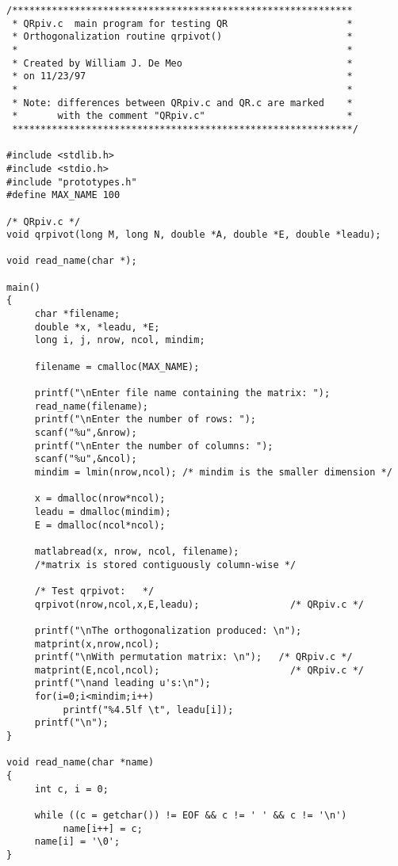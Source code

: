 \documentclass{article}
\begin{document}
\begin{verbatim}
/************************************************************
 * QRpiv.c  main program for testing QR                     *
 * Orthogonalization routine qrpivot()                      *
 *                                                          *
 * Created by William J. De Meo                             *
 * on 11/23/97                                              *
 *                                                          *
 * Note: differences between QRpiv.c and QR.c are marked    *
 *       with the comment "QRpiv.c"                         *
 ************************************************************/

#include <stdlib.h>
#include <stdio.h>
#include "prototypes.h"
#define MAX_NAME 100

/* QRpiv.c */
void qrpivot(long M, long N, double *A, double *E, double *leadu); 

void read_name(char *);

main()
{
     char *filename;
     double *x, *leadu, *E;
     long i, j, nrow, ncol, mindim;
  
     filename = cmalloc(MAX_NAME);

     printf("\nEnter file name containing the matrix: ");
     read_name(filename);
     printf("\nEnter the number of rows: ");
     scanf("%u",&nrow);
     printf("\nEnter the number of columns: ");
     scanf("%u",&ncol);
     mindim = lmin(nrow,ncol); /* mindim is the smaller dimension */

     x = dmalloc(nrow*ncol);
     leadu = dmalloc(mindim);
     E = dmalloc(ncol*ncol);
  
     matlabread(x, nrow, ncol, filename); 
     /*matrix is stored contiguously column-wise */

     /* Test qrpivot:   */
     qrpivot(nrow,ncol,x,E,leadu);                /* QRpiv.c */

     printf("\nThe orthogonalization produced: \n");
     matprint(x,nrow,ncol);
     printf("\nWith permutation matrix: \n");   /* QRpiv.c */
     matprint(E,ncol,ncol);                       /* QRpiv.c */
     printf("\nand leading u's:\n");
     for(i=0;i<mindim;i++)
          printf("%4.5lf \t", leadu[i]);
     printf("\n");
}
  
void read_name(char *name)
{
     int c, i = 0;
  
     while ((c = getchar()) != EOF && c != ' ' && c != '\n')
          name[i++] = c;
     name[i] = '\0';
}
\end{verbatim}
\end{document}
